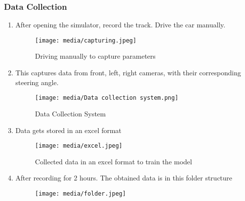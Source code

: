 \documentclass[ 12pt,a4paper,twocolumn,fleqn]{article}
\begin{document}
\subsubsection{Data Collection}
\begin{enumerate}
    \item After opening the simulator, record the track. Drive the car manually. 
    \begin{figure}[H]
    \texttt{[image: media/capturing.jpeg]}
    \centering
    \caption{Driving manually to capture parameters}
    \end{figure}
    \item This captures data from front, left, right cameras, with their corresponding steering angle. 
    \begin{figure}[H]
    \texttt{[image: media/Data collection system.png]}
    \centering
    \caption{Data Collection System}
    \end{figure}
    \item Data gets stored in an excel format
    \begin{figure}[H]
    \texttt{[image: media/excel.jpeg]}
    \centering
    \caption{Collected data in an excel format to train the model}
    \end{figure}
    \item After recording for 2 hours. The obtained data is in this folder structure
    \begin{figure}[H]
    \texttt{[image: media/folder.jpeg]}
    \centering
    \end{figure}
\end{enumerate}
\end{document}
